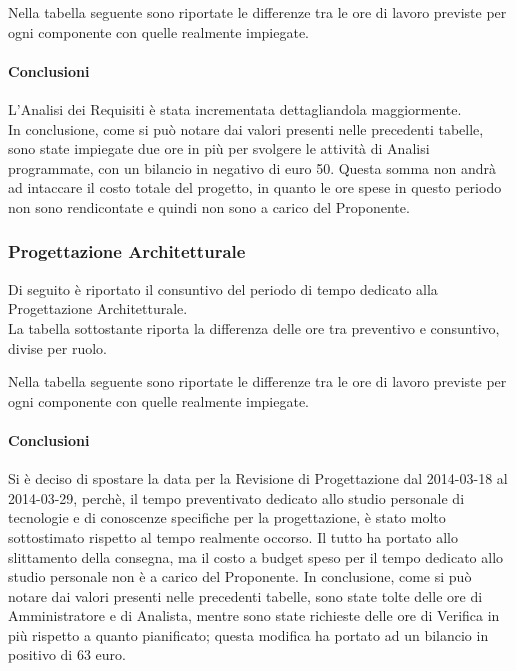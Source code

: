
Nella tabella seguente sono riportate le differenze tra le ore di lavoro previste per ogni componente con quelle realmente impiegate.


\paragraph{Conclusioni}
L'Analisi dei Requisiti è stata incrementata dettagliandola maggiormente.\\
In conclusione, come si può notare dai valori presenti nelle precedenti tabelle, sono state impiegate due ore in più per svolgere le attività di Analisi programmate, con un bilancio in negativo di euro 50. Questa somma non andrà ad intaccare il costo totale del progetto, in quanto le ore spese in questo periodo non sono rendicontate e quindi non sono a carico del Proponente.

\subsubsection{Progettazione Architetturale}
Di seguito è riportato il consuntivo del periodo di tempo dedicato alla Progettazione Architetturale.\\
La tabella sottostante riporta la differenza delle ore tra preventivo e consuntivo, divise per ruolo.


Nella tabella seguente sono riportate le differenze tra le ore di lavoro previste per ogni componente con quelle realmente impiegate.


\paragraph{Conclusioni}
Si è deciso di spostare la data per la Revisione di Progettazione dal 2014-03-18 al 2014-03-29, perchè, il tempo preventivato dedicato allo studio personale di tecnologie e di conoscenze specifiche per la progettazione, è stato molto sottostimato rispetto al tempo realmente occorso. Il tutto ha portato allo slittamento della consegna, ma il costo a budget speso per il tempo dedicato allo studio personale non è a carico del Proponente.
In conclusione, come si può notare dai valori presenti nelle precedenti tabelle, sono state tolte delle ore di Amministratore e di Analista, mentre sono state richieste delle ore di Verifica in più rispetto a quanto pianificato; questa modifica ha portato ad un bilancio in positivo di 63 euro.

